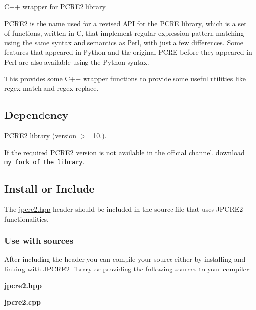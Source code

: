 C++ wrapper for P\+C\+R\+E2 library

\href{https://travis-ci.org/jpcre2/jpcre2/}{\tt } \href{http://docs.neurobin.org/jpcre2/index.html}{\tt } \href{http://docs.neurobin.org/jpcre2/index.html}{\tt } \href{http://www.regular-expressions.info/pcre2.html}{\tt }

P\+C\+R\+E2 is the name used for a revised A\+PI for the P\+C\+RE library, which is a set of functions, written in C, that implement regular expression pattern matching using the same syntax and semantics as Perl, with just a few differences. Some features that appeared in Python and the original P\+C\+RE before they appeared in Perl are also available using the Python syntax.

This provides some C++ wrapper functions to provide some useful utilities like regex match and regex replace.\hypertarget{index_dependency}{}\subsection{Dependency}\label{index_dependency}

\begin{DoxyEnumerate}
\item P\+C\+R\+E2 library ({\ttfamily version $>$=10.}).
\end{DoxyEnumerate}

If the required P\+C\+R\+E2 version is not available in the official channel, download \href{https://github.com/jpcre2/pcre2}{\tt my fork of the library}.\hypertarget{index_install-or-include}{}\subsection{Install or Include}\label{index_install-or-include}
The {\ttfamily \hyperlink{jpcre2_8hpp}{jpcre2.\+hpp}} header should be included in the source file that uses J\+P\+C\+R\+E2 functionalities.\hypertarget{index_use-with-sources}{}\subsubsection{Use with sources}\label{index_use-with-sources}
After including the header you can compile your source either by installing and linking with J\+P\+C\+R\+E2 library or providing the following sources to your compiler\+:


\begin{DoxyEnumerate}
\item {\bfseries \hyperlink{jpcre2_8hpp}{jpcre2.\+hpp}}
\item {\bfseries jpcre2.\+cpp}
\end{DoxyEnumerate}

